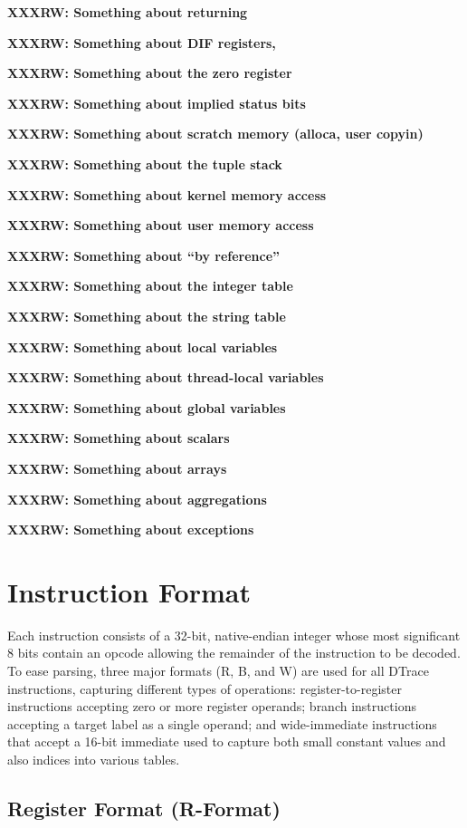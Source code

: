 \textbf{XXXRW: Something about returning}

\textbf{XXXRW: Something about DIF registers, \nregs{}}

\textbf{XXXRW: Something about the zero register}

\textbf{XXXRW: Something about implied status bits}

\textbf{XXXRW: Something about scratch memory (alloca, user copyin)}

\textbf{XXXRW: Something about the tuple stack}

\textbf{XXXRW: Something about kernel memory access}

\textbf{XXXRW: Something about user memory access}

\textbf{XXXRW: Something about ``by reference''}

\textbf{XXXRW: Something about the integer table}

\textbf{XXXRW: Something about the string table}

\textbf{XXXRW: Something about local variables}

\textbf{XXXRW: Something about thread-local variables}

\textbf{XXXRW: Something about global variables}

\textbf{XXXRW: Something about scalars}

\textbf{XXXRW: Something about arrays}

\textbf{XXXRW: Something about aggregations}

\textbf{XXXRW: Something about exceptions}

\section{Instruction Format}

Each instruction consists of a 32-bit, native-endian integer whose most
significant 8 bits contain an opcode allowing the remainder of the instruction
to be decoded.
To ease parsing, three major formats (R, B, and W) are used for all DTrace
instructions, capturing different types of operations: register-to-register
instructions accepting zero or more register operands; branch instructions
accepting a target label as a single operand; and wide-immediate instructions
that accept a 16-bit immediate used to capture both small constant values and
also indices into various tables.

\subsection{Register Format (R-Format)}

